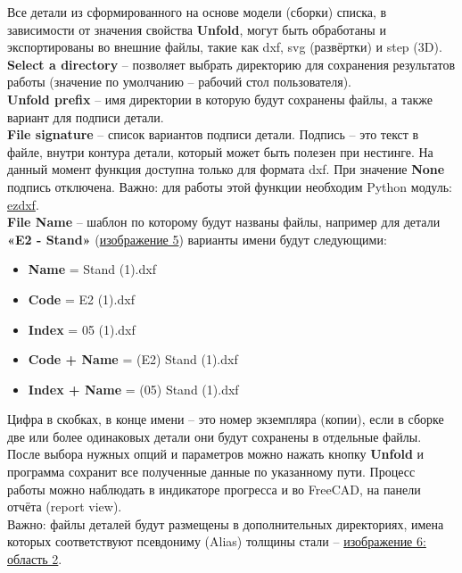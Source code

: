 \documentclass[a4paper,12pt]{article}
\begin{document}
Все детали из сформированного на основе модели (сборки) списка, в зависимости от значения свойства \textbf{Unfold}, могут быть обработаны и экспортированы во внешние файлы, такие как dxf, svg (развёртки) и step (3D).\\

\textbf{Select a directory} -- позволяет выбрать директорию для сохранения результатов работы (значение по умолчанию -- рабочий стол пользователя).\\

\textbf{Unfold prefix} -- имя директории в которую будут сохранены файлы, а также вариант для подписи детали.\\

\textbf{File signature} -- список вариантов подписи детали. Подпись -- это текст в файле, внутри контура детали, который может быть полезен при нестинге. На данный момент функция доступна только для формата dxf. При значение \textbf{None} подпись отключена. Важно: для работы этой функции необходим Python модуль: \href{https://pypi.org/project/ezdxf/}{ezdxf}.\\

\textbf{File Name} -- шаблон по которому будут названы файлы, например для детали \textbf{«E2 - Stand»} (\hyperref[sec:properties]{изображение 5}) варианты имени будут следующими:
\begin{itemize}
	\item \textbf{Name} = Stand (1).dxf
	\item \textbf{Code} = E2 (1).dxf
	\item \textbf{Index} = 05 (1).dxf
	\item \textbf{Code + Name} = (E2) Stand (1).dxf
	\item \textbf{Index + Name} = (05) Stand (1).dxf
\end{itemize}

Цифра в скобках, в конце имени -- это номер экземпляра (копии), если в сборке две или более одинаковых детали они будут сохранены в отдельные файлы.\\

После выбора нужных опций и параметров можно нажать кнопку \textbf{Unfold} и программа сохранит все полученные данные по указанному пути. Процесс работы можно наблюдать в индикаторе прогресса и во FreeCAD, на панели отчёта (report view).\\

Важно: файлы деталей будут размещены в дополнительных директориях, имена которых соответствуют псевдониму (Alias) толщины стали -- \hyperref[sec:pref_sm]{изображение 6: область 2}.
\end{document}
